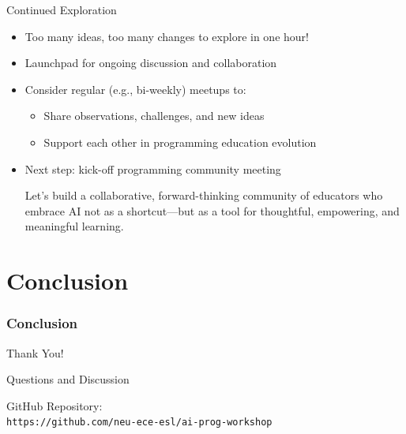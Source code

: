 \documentclass[xcolor=dvipsnames, aspectratio=169]{beamer}
\newcommand{\footername}{AI in Programming Education}
\newcommand{\setfooter}[2]{\renewcommand{\footername}{\href{#2}{#1}}}
\begin{document}
\begin{frame}{Continued Exploration}
  \begin{itemize}
    \item Too many ideas, too many changes to explore in one hour!
    \item Launchpad for ongoing discussion and collaboration
    \item Consider regular (e.g., bi-weekly) meetups to:
      \begin{itemize}
        \item Share observations, challenges, and new ideas
        \item Support each other in programming education evolution
      \end{itemize}
    \item Next step: kick-off programming community meeting
    \vspace{3em}
    \begin{infobox}
      Let's build a collaborative, forward-thinking community of educators who embrace AI not as a shortcut—but as a tool for thoughtful, empowering, and meaningful learning.
    \end{infobox}
  \end{itemize}
\end{frame}

\part[Conclusion]{Conclusion}
\section{Conclusion}
\setfooter{Conclusion}{https://github.com/neu-ece-esl/ai-prog-workshop}
 

\begin{frame}{Thank You!}
  \begin{center}
    \Large{Questions and Discussion}
    
    \vspace{2em}
    
    GitHub Repository:\\
    \texttt{https://github.com/neu-ece-esl/ai-prog-workshop}
  \end{center}
\end{frame}
\end{document}
